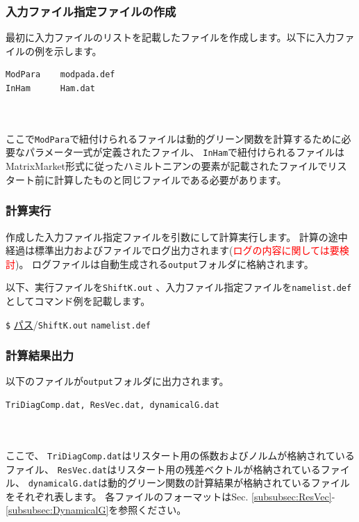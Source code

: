 \documentclass[12pt,titlepage]{jarticle}
\begin{document}
\subsubsection*{入力ファイル指定ファイルの作成}
最初に入力ファイルのリストを記載したファイルを作成します。以下に入力ファイルの例を示します。\\
\begin{minipage}{10cm}
\begin{screen}
\begin{verbatim}
ModPara    modpada.def
InHam      Ham.dat
\end{verbatim}
\end{screen}
\end{minipage}
\\\\
ここで\verb|ModPara|で紐付けられるファイルは動的グリーン関数を計算するために必要なパラメータ一式が定義されたファイル、
\verb|InHam|で紐付けられるファイルはMatrixMarket形式に従ったハミルトニアンの要素が記載されたファイルでリスタート前に計算したものと同じファイルである必要があります。

\subsubsection*{計算実行}
作成した入力ファイル指定ファイルを引数にして計算実行します。
計算の途中経過は標準出力およびファイルでログ出力されます(\textcolor{red}{ログの内容に関しては要検討})。
ログファイルは自動生成される\verb|output|フォルダに格納されます。

以下、実行ファイルを\verb|ShiftK.out| 、入力ファイル指定ファイルを\verb|namelist.def|としてコマンド例を記載します。

\verb|$| \underline{パス}/\verb|ShiftK.out|  \verb|namelist.def|

\subsubsection*{計算結果出力}
以下のファイルが\verb|output|フォルダに出力されます。
\\
\begin{minipage}{11cm}
\begin{screen}
\begin{verbatim}
TriDiagComp.dat, ResVec.dat, dynamicalG.dat
\end{verbatim}
\end{screen}
\end{minipage}
\\ \\
ここで、
\verb|TriDiagComp.dat|はリスタート用の係数およびノルムが格納されているファイル、
\verb|ResVec.dat|はリスタート用の残差ベクトルが格納されているファイル、
\verb|dynamicalG.dat|は動的グリーン関数の計算結果が格納されているファイルをそれぞれ表します。
各ファイルのフォーマットはSec. \ref{subsubsec:ResVec}-\ref{subsubsec:DynamicalG}を参照ください。
\end{document}
